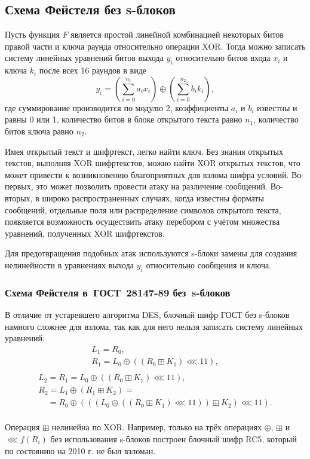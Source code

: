 \subsection{Схема Фейстеля без s-блоков}

Пусть функция $F$ является простой линейной комбинацией некоторых битов правой части и ключа раунда относительно операции XOR. Тогда можно записать систему линейных уравнений битов выхода $y_i$ относительно битов входа $x_i$ и ключа $k_i$ после всех 16 раундов в виде
    \[ y_i = \left(\sum_{i=0}^{n_1} a_i x_i\right) \oplus \left(\sum_{i=0}^{n_2} b_i k_i\right), \]
где суммирование производится по модулю 2, коэффициенты $a_i$ и $b_i$ известны и равны 0 или 1, количество битов в блоке открытого текста равно $n_1$, количество битов ключа равно $n_2$.

Имея открытый текст и шифртекст, легко найти ключ. Без знания открытых текстов, выполняя XOR шифртекстов, можно найти XOR открытых текстов, что может привести к возникновению благоприятных для взлома шифра условий. Во-первых, это может позволить провести атаку на различение сообщений. Во-вторых, в широко распространенных случаях, когда известны форматы сообщений, отдельные поля или распределение символов открытого текста, появляется возможность осуществить атаку перебором с учётом множества уравнений, полученных XOR шифртекстов.

Для предотвращения подобных атак используются s-блоки замены для создания нелинейности в уравнениях выхода $y_i$ относительно сообщения и ключа.


\subsubsection[Схема Фейстеля в ГОСТ 28147-89 без s-блоков]{Схема Фейстеля в~ГОСТ~28147-89 без~s-блоков}

В отличие от устаревшего алгоритма DES, блочный шифр ГОСТ без s-блоков намного сложнее для взлома, так как для него нельзя записать систему линейных уравнений:
\[
    \begin{array}{l}
        L_1 = R_0, \\
        R_1 = L_0 \oplus ((R_0 \boxplus K_1) \lll 11), \\
    \end{array}
\] \[
    \begin{array}{l}
        L_2 = R_1 = L_0 \oplus ((R_0 \boxplus K_1) \lll 11), \\
        R_2 = L_1 \oplus (R_1 \boxplus K_2)  = \\
        ~~~~~= R_0 \oplus (((L_0 \oplus ((R_0 \boxplus K_1) \lll 11)) \boxplus K_2) \lll 11). \\
    \end{array}
\]

Операция $\boxplus$ нелинейна по XOR. Например, только на трёх операциях $\oplus$, $\boxplus$ и $\lll f(R_i)$ без использования s-блоков построен блочный шифр RC5, который по состоянию на 2010 г. не был взломан.
